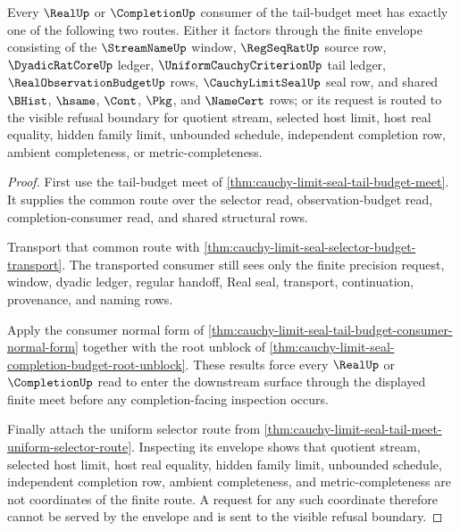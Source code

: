 \begin{theorem}
\label{thm:cauchy-limit-seal-tail-meet-refusal-fork}
Every $\RealUp$ or $\CompletionUp$ consumer of the tail-budget meet has exactly one of the following two routes. Either it factors through the finite envelope consisting of the $\StreamNameUp$ window, $\RegSeqRatUp$ source row, $\DyadicRatCoreUp$ ledger, $\UniformCauchyCriterionUp$ tail ledger, $\RealObservationBudgetUp$ rows, $\CauchyLimitSealUp$ seal row, and shared $\BHist$, $\hsame$, $\Cont$, $\Pkg$, and $\NameCert$ rows; or its request is routed to the visible refusal boundary for quotient stream, selected host limit, host real equality, hidden family limit, unbounded schedule, independent completion row, ambient completeness, or metric-completeness.
\end{theorem}
\begin{proof}
First use the tail-budget meet of \autoref{thm:cauchy-limit-seal-tail-budget-meet}. It supplies the common route over the selector read, observation-budget read, completion-consumer read, and shared structural rows.

Transport that common route with \autoref{thm:cauchy-limit-seal-selector-budget-transport}. The transported consumer still sees only the finite precision request, window, dyadic ledger, regular handoff, Real seal, transport, continuation, provenance, and naming rows.

Apply the consumer normal form of \autoref{thm:cauchy-limit-seal-tail-budget-consumer-normal-form} together with the root unblock of \autoref{thm:cauchy-limit-seal-completion-budget-root-unblock}. These results force every $\RealUp$ or $\CompletionUp$ read to enter the downstream surface through the displayed finite meet before any completion-facing inspection occurs.

Finally attach the uniform selector route from \autoref{thm:cauchy-limit-seal-tail-meet-uniform-selector-route}. Inspecting its envelope shows that quotient stream, selected host limit, host real equality, hidden family limit, unbounded schedule, independent completion row, ambient completeness, and metric-completeness are not coordinates of the finite route. A request for any such coordinate therefore cannot be served by the envelope and is sent to the visible refusal boundary.
\end{proof}

